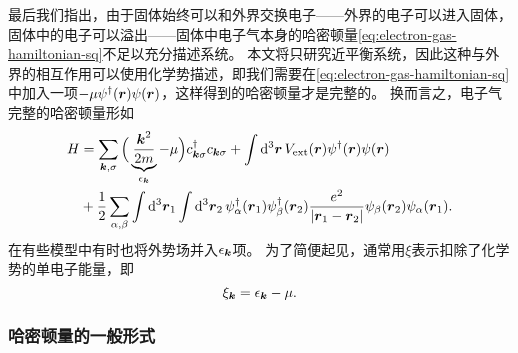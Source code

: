 \documentclass[hyperref, UTF8, a4paper]{ctexart}
\begin{document}
最后我们指出，由于固体始终可以和外界交换电子——外界的电子可以进入固体，固体中的电子可以溢出——固体中电子气本身的哈密顿量\eqref{eq:electron-gas-hamiltonian-sq}不足以充分描述系统。
本文将只研究近平衡系统，因此这种与外界的相互作用可以使用化学势描述，即我们需要在\eqref{eq:electron-gas-hamiltonian-sq}中加入一项$-\mu {\psi}^\dagger(\vb*{r}) {\psi}(\vb*{r})$，这样得到的哈密顿量才是完整的。
换而言之，电子气完整的哈密顿量形如
\begin{equation}
    \begin{aligned}
        {H} &= \sum_{\vb*{k}, \sigma} \Big( \underbrace{\frac{\vb*{k}^2}{2m}}_{\epsilon_{\vb*{k}}} - \mu \Big) {c}^\dagger_{\vb*{k} \sigma} {c}_{\vb*{k} \sigma} 
        + \int \dd[3]{\vb*{r}} V_\text{ext}(\vb*{r}) {\psi}^\dagger(\vb*{r}) {\psi}(\vb*{r}) \\ 
        &+ \frac{1}{2} \sum_{\alpha, \beta} \int \dd[3]{\vb*{r}_1} \int \dd[3]{\vb*{r}_2} 
        {\psi}_\alpha^\dagger (\vb*{r}_1) {\psi}_\beta^\dagger (\vb*{r}_2) \frac{e^2}{\abs{\vb*{r}_1 - \vb*{r}_2}} {\psi}_\beta (\vb*{r}_2) {\psi}_\alpha (\vb*{r}_1).
    \end{aligned}
    \label{eq:full-electron-gas-hamiltonian}
\end{equation}
在有些模型中有时也将外势场并入$\epsilon_{\vb*{k}}$项。
为了简便起见，通常用$\xi$表示扣除了化学势的单电子能量，即
\begin{equation}
    \xi_{\vb*{k}} = \epsilon_{\vb*{k}} - \mu.
\end{equation}

\subsubsection{哈密顿量的一般形式}
\end{document}
